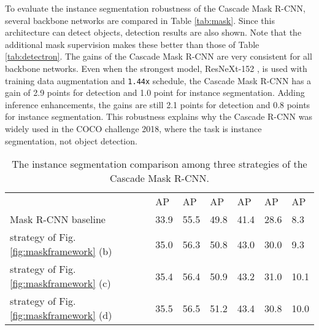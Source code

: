 \documentclass[10pt,journal,compsoc]{IEEEtran}
\newcommand{\tablestyle}[2]{\setlength{\tabcolsep}{#1}\renewcommand{\arraystretch}{#2}\centering\footnotesize}
\begin{document}
To evaluate the instance segmentation robustness of the Cascade Mask R-CNN,
several backbone networks are compared in Table \ref{tab:mask}.
Since this architecture can detect objects, detection results
are also shown. Note that the additional mask supervision makes these
better than those of Table \ref{tab:detectron}.
The gains of the Cascade Mask R-CNN are very consistent for all backbone networks.
Even when the strongest model, ResNeXt-152 \cite{DBLP:conf/cvpr/XieGDTH17},
is used with training data augmentation and \texttt{1.44x} schedule, the
Cascade Mask R-CNN has a gain of 2.9 points for detection and 1.0 point for
instance segmentation. Adding inference enhancements, the gains are
still 2.1 points for detection and 0.8 points for instance segmentation.
This robustness explains why the Cascade R-CNN was widely used in the
COCO challenge 2018, where the task is instance segmentation, not
object detection.


\begin{table}[t]
\tablestyle{1.8pt}{1.2}
\begin{tabular}{l|x{22}|x{22}x{22}x{22}x{22}x{22}}
& AP & AP & AP &AP &AP &AP\\ [.1em]
\shline
Mask R-CNN baseline &33.9 &55.5  &49.8 &41.4 &28.6  &8.3\\\hline
strategy of Fig. \ref{fig:maskframework} (b) &35.0 &56.3  &50.8 &43.0 &30.0  &9.3\\
strategy of Fig. \ref{fig:maskframework} (c) &35.4 &56.4  &50.9 &43.2 &31.0  &10.1\\
strategy of Fig. \ref{fig:maskframework} (d) &35.5 &56.5  &51.2 &43.4 &30.8  &10.0\\
\end{tabular}\vspace{2mm}
\caption{The instance segmentation comparison among three strategies of the Cascade Mask R-CNN.}
\label{tab:mask solutions}\vspace{-3mm}
\end{table}
\end{document}

